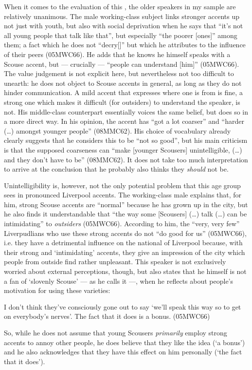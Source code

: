 When it comes to the evaluation of this , the older speakers in my sample are relatively unanimous.
The male working-class subject links stronger accents up not just with youth, but also with social deprivation when he says that ``it's not all young people that talk like that'', but especially ``the poorer [ones]'' among them; a fact which he does not ``decry[]'' but which he attributes to the influence of their peers (05MWC66).
He adds that he knows he himself speaks with a Scouse accent, but --- crucially --- ``people can understand [him]'' (05MWC66).
The value judgement is not explicit here, but nevertheless not too difficult to unearth: he does not object to Scouse accents in general, as long as they do not hinder communication.
A mild accent that expresses where one is from is fine, a strong one which makes it difficult (for outsiders) to understand the speaker, is not.
His middle-class counterpart essentially voices the same belief, but does so in a more direct way.
In his opinion, the accent has ``got a lot coarser'' and ``harder (\ldots) amongst younger people'' (08MMC62).
His choice of vocabulary already clearly suggests that he considers this to be ``not so good'', but his main criticism is that the supposed coarseness can ``make [younger Scousers] unintelligible, (\ldots) and they don't have to be'' (08MMC62).
It does not take too much interpretation to arrive at the conclusion that he probably also thinks they \emph{should} not be.

Unintelligibility is, however, not the only potential problem that this age group sees in pronounced Liverpool accents.
The working-class male explains that, for him, strong Scouse accents are ``normal'' because he has grown up in the city, but he also finds it understandable that ``the way some [Scousers] (\ldots) talk (\ldots) can be intimidating'' to \emph{outsiders} (05MWC66).
According to him, the ``very, very few'' Liverpudlians who use these strong accents do not ``do good for us'' (05MWC66), i.e. they have a detrimental influence on the national  of Liverpool because, with their strong and `intimidating' accents, they give an impression of the city which people from outside find rather unpleasant.
This speaker is not exclusively worried about external perceptions, though, but also states that he himself is not a fan of `slovenly Scouse' --- as he calls it ---, when he reflects about people's motivation for using these varieties: 
\begin{example}
	I don't think they've consciously gone out to say `we'll speak this way so to get on everybody's nerves'. The fact that it does is a bonus. (05MWC66)
\end{example}
So, while he does not assume that young Scousers \emph{primarily} employ strong accents to annoy other people, he does believe that they like the idea (`a bonus') and he also acknowledges that they have this effect on him personally (`the fact that it does').

